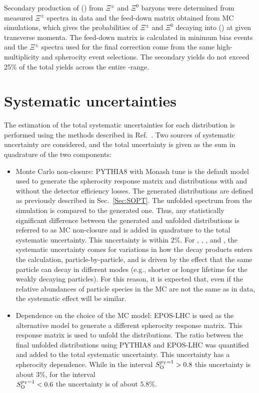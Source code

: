 Secondary production of \LA(\AL) from $\Xi^\pm$ and $\Xi^0$ baryons were determined from measured $\Xi^\pm$ spectra in data and the feed-down matrix obtained from MC simulations, which gives the probabilities of $\Xi^\pm$ and $\Xi^0$ decaying into \LA(\AL) at given transverse momenta. The feed-down matrix is calculated in minimum bias events and the $\Xi^\pm$ \pt spectra used for the final correction come from the same high-multiplicity and spherocity event selections. The secondary yields do not exceed 25\% of the total yields across the entire \pt-range.

\section{Systematic uncertainties}\label{Sec:Sys}
The estimation of the total systematic uncertainties for each \SOPT distribution is performed using the methods described in Ref.~\cite{ALICE:2023yuk}. Two sources of systematic uncertainty are considered, and the total uncertainty is given as the sum in quadrature of the two components:

\begin{itemize}
    \item Monte Carlo non-closure: PYTHIA8 with Monash tune is the default model used to generate the spherocity response matrix and \SOPT distributions with and without the detector efficiency losses. The generated \SOPT distributions are defined as previously described in Sec.~\ref{Sec:SOPT}. The unfolded \SOPT spectrum from the simulation is compared to the generated one. Thus, any statistically significant difference between the generated and unfolded distributions is referred to as MC non-closure and is added in quadrature to the total systematic uncertainty. This uncertainty is within $2\%$. For \PHI, \KSTAR, \kzero, \LA and \XI, the systematic uncertainty comes for variations in how the decay products enters the \SOPT calculation, particle-by-particle, and is driven by the effect that the same particle can decay in different modes (e.g., shorter or longer lifetime for the weakly decaying particles). For this reason, it is expected that, even if the relative abundances of particle species in the MC are not the same as in data, the systematic effect will be similar.
    
    \item Dependence on the choice of the MC model: EPOS-LHC is used as the alternative model to generate a different spherocity response matrix. This response matrix is used to unfold the \SOPT distributions. The ratio between the final unfolded distributions using PYTHIA8 and EPOS-LHC was quantified and added to the total systematic uncertainty. This uncertainty has a spherocity dependence. While in the interval $S_{\text{O}}^{p_{\rm T}=1} > 0.8$ this uncertainty is about $3\%$, for the interval \\$S_{\text{O}}^{p_{\rm T}=1} < 0.6$ the uncertainty is of about $5.8\%$.
\end{itemize}


